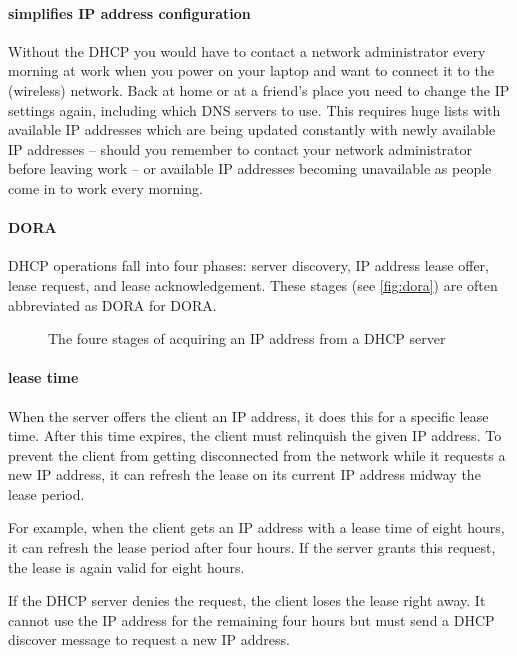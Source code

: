 \paragraph{simplifies \acs{IP} address configuration}
Without the \gls{DHCP} you would have to contact a network administrator every morning at work when you power on your laptop and want to connect it to the (wireless) network.
Back at home or at a friend's place you need to change the \acs{IP} settings again, including which \acs{DNS} servers to use.
This requires huge lists with available \acs{IP} addresses which are being updated constantly with newly available \acs{IP} addresses -- should you remember to contact your network administrator before leaving work -- or available \acs{IP} addresses becoming unavailable as people come in to work every morning.

\paragraph{\acs{DORA}}
\gls{DHCP} operations fall into four phases: server discovery, \acs{IP} address lease offer, lease request, and lease acknowledgement.
These stages (see \vref{fig:dora}) are often abbreviated as \acs{DORA} for \acl{DORA}.

\begin{figure}
    \centering
    
    \caption{The foure stages of acquiring an \acs{IP} address from a \acs{DHCP} server}
    \label{fig:dora}
\end{figure}

\paragraph{lease time}
When the server offers the client an \acs{IP} address, it does this for a specific lease time.
After this time expires, the client must relinquish the given \acs{IP} address.
To prevent the client from getting disconnected from the network while it requests a new \acs{IP} address, it can refresh the lease on its current \acs{IP} address midway the lease period.

For example, when the client gets an \acs{IP} address with a lease time of eight hours, it can refresh the lease period after four hours.
If the server grants this request, the lease is again valid for eight hours.

If the \acs{DHCP} server denies the request, the client loses the lease right away.
It cannot use the \acs{IP} address for the remaining four hours but must send a \acs{DHCP} discover message to request a new \acs{IP} address.

